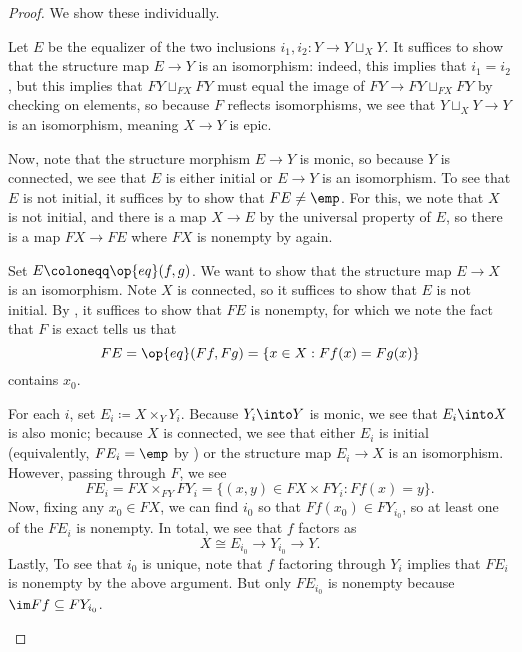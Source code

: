 \documentclass{amsart}
\begin{document}
\begin{proof}
    We show these individually.
    \begin{listalph}
        \item Let $E$ be the equalizer of the two inclusions $i_1,i_2\colon Y\to Y\sqcup_XY$. It suffices to show that the structure map $E\to Y$ is an isomorphism: indeed, this implies that $i_1=i_2$, but this implies that $FY\sqcup_{FX}FY$ must equal the image of $FY\to FY\sqcup_{FX}FY$ by checking on elements, so because $F$ reflects isomorphisms, we see that $Y\sqcup_XY\to Y$ is an isomorphism, meaning $X\to Y$ is epic.

        Now, note that the structure morphism $E\to Y$ is monic, so because $Y$ is connected, we see that $E$ is either initial or $E\to Y$ is an isomorphism. To see that $E$ is not initial, it suffices by  to show that $FE\ne\emp$. For this, we note that $X$ is not initial, and there is a map $X\to E$ by the universal property of $E$, so there is a map $FX\to FE$ where $FX$ is nonempty by  again.

        \item Set $E\coloneqq\op{eq}(f,g)$. We want to show that the structure map $E\to X$ is an isomorphism. Note $X$ is connected, so it suffices to show that $E$ is not initial. By , it suffices to show that $FE$ is nonempty, for which we note the fact that $F$ is exact tells us that
        \[FE=\op{eq}(Ff,Fg)=\{x\in X:Ff(x)=Fg(x)\}\]
        contains $x_0$.

        \item For each $i$, set $E_i\coloneqq X\times_YY_i$. Because $Y_i\into Y$ is monic, we see that $E_i\into X$ is also monic; because $X$ is connected, we see that either $E_i$ is initial (equivalently, $FE_i=\emp$ by ) or the structure map $E_i\to X$ is an isomorphism. However, passing through $F$, we see
        \[FE_i=FX\times_{FY}FY_i=\{(x,y)\in FX\times FY_i:Ff(x)=y\}.\]
        Now, fixing any $x_0\in FX$, we can find $i_0$ so that $Ff(x_0)\in FY_{i_0}$, so at least one of the $FE_i$ is nonempty. In total, we see that $f$ factors as
        \[X\cong E_{i_0}\to Y_{i_0}\to Y.\]
        Lastly, To see that $i_0$ is unique, note that $f$ factoring through $Y_i$ implies that $FE_i$ is nonempty by the above argument. But only $FE_{i_0}$ is nonempty because $\im Ff\subseteq FY_{i_0}$.


\end{listalph}
\end{proof}
\end{document}
